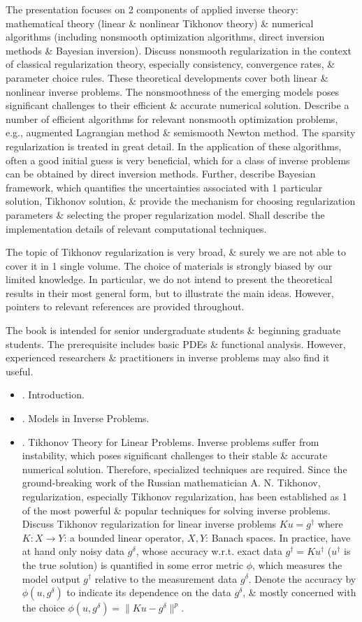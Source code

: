 \documentclass{article}
\begin{document}
\begin{enumerate}
	The presentation focuses on 2 components of applied inverse theory: mathematical theory (linear \& nonlinear Tikhonov theory) \& numerical algorithms (including nonsmooth optimization algorithms, direct inversion methods \& Bayesian inversion). Discuss nonsmooth regularization in the context of classical regularization theory, especially consistency, convergence rates, \& parameter choice rules. These theoretical developments cover both linear \& nonlinear inverse problems. The nonsmoothness of the emerging models poses significant challenges to their efficient \& accurate numerical solution. Describe a number of efficient algorithms for relevant nonsmooth optimization problems, e.g., augmented Lagrangian method \& semismooth Newton method. The sparsity regularization is treated in great detail. In the application of these algorithms, often a good initial guess is very beneficial, which for a class of inverse problems can be obtained by direct inversion methods. Further, describe Bayesian framework, which quantifies the uncertainties associated with 1 particular solution, Tikhonov solution, \& provide the mechanism for choosing regularization parameters \& selecting the proper regularization model. Shall describe the implementation details of relevant computational techniques.
	
	The topic of Tikhonov regularization is very broad, \& surely we are not able to cover it in 1 single volume. The choice of materials is strongly biased by our limited knowledge. In particular, we do not intend to present the theoretical results in their most general form, but to illustrate the main ideas. However, pointers to relevant references are provided throughout.
	
	The book is intended for senior undergraduate students \& beginning graduate students. The prerequisite includes basic PDEs \& functional analysis. However, experienced researchers \& practitioners in inverse problems may also find it useful.
	\begin{itemize}
		\item {. Introduction.}
		\item {. Models in Inverse Problems.}
		\item {. Tikhonov Theory for Linear Problems.} Inverse problems suffer from instability, which poses significant challenges to their stable \& accurate numerical solution. Therefore, specialized techniques are required. Since the ground-breaking work of the Russian mathematician {\sc A. N. Tikhonov}, regularization, especially Tikhonov regularization, has been established as 1 of the most powerful \& popular techniques for solving inverse problems. Discuss Tikhonov regularization for linear inverse problems $Ku = g^\dagger$ where $K:X\to Y$: a bounded linear operator, $X,Y$: Banach spaces. In practice, have at hand only noisy data $g^\delta$, whose accuracy w.r.t. exact data $g^\dagger = Ku^\dagger$ ($u^\dagger$ is the true solution) is quantified in some error metric $\phi$, which measures the model output $g^\dagger$ relative to the measurement data $g^\delta$. Denote the accuracy by $\phi(u,g^\delta)$ to indicate its dependence on the data $g^\delta$, \& mostly concerned with the choice $\phi(u,g^\delta) = \|Ku - g^\delta\|^p$.
		

\end{itemize}
\end{enumerate}
\end{document}
